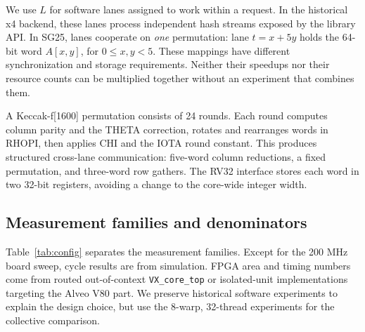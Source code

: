 \documentclass[conference,letterpaper]{IEEEtran}
\newcommand{\code}[1]{\texttt{#1}}
\newcommand{\sg}{SG25}
\begin{document}
We use $L$ for software lanes assigned to work within a request. In the
historical x4 backend, these lanes process independent hash streams exposed
by the library API. In \sg{}, lanes cooperate on \emph{one} permutation:
lane $t=x+5y$ holds the 64-bit word $A[x,y]$, for $0\leq x,y<5$.
These mappings have different synchronization and storage requirements.
Neither their speedups nor their resource counts can be multiplied together
without an experiment that combines them.

A Keccak-f[1600] permutation consists of 24 rounds. Each round computes
column parity and the THETA correction, rotates and rearranges words in
RHOPI, then applies CHI and the IOTA round constant. This produces structured
cross-lane communication: five-word column reductions, a fixed permutation,
and three-word row gathers. The RV32 interface stores each word in two
32-bit registers, avoiding a change to the core-wide integer width.

\subsection{Measurement families and denominators}
Table~\ref{tab:config} separates the measurement families. Except for the
200 MHz board sweep, cycle results are from simulation. FPGA area and timing
numbers come from routed out-of-context \code{VX\_core\_top} or isolated-unit
implementations targeting the Alveo V80 part. We preserve historical software
experiments to explain the design choice, but use the 8-warp, 32-thread
experiments for the collective comparison.
\end{document}
